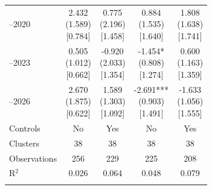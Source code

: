 \begin{threeparttable}
\begin{tabular}{@{}lcccc}
\addlinespace[0.25ex]
\addlinespace[0.25ex]
2018–2020 & \makecell{2.432 \\ (1.589) \\{}[0.784]} & \makecell{0.775 \\ (2.196) \\{}[1.458]} & \makecell{0.884 \\ (1.535) \\{}[1.640]} & \makecell{1.808 \\ (1.638) \\{}[1.741]} \\
\addlinespace[0.25ex]
\addlinespace[0.25ex]
2021–2023 & \makecell{0.505 \\ (1.012) \\{}[0.662]} & \makecell{-0.920 \\ (2.033) \\{}[1.354]} & \makecell{-1.454* \\ (0.808) \\{}[1.274]} & \makecell{0.600 \\ (1.163) \\{}[1.359]} \\
\addlinespace[0.25ex]
\addlinespace[0.25ex]
2024–2026 & \makecell{2.670 \\ (1.875) \\{}[0.622]} & \makecell{1.589 \\ (1.303) \\{}[1.092]} & \makecell{-2.691*** \\ (0.903) \\{}[1.491]} & \makecell{-1.633 \\ (1.056) \\{}[1.555]} \\
\addlinespace[0.25ex]
\midrule
\addlinespace[1ex]
Controls & No & Yes & No & Yes \\
\addlinespace[0.25ex]
\addlinespace[0.25ex]
Clusters & 38 & 38 & 38 & 38 \\
\addlinespace[0.25ex]
\addlinespace[0.25ex]
Observations & 256 & 229 & 225 & 208 \\
\addlinespace[0.25ex]
\addlinespace[0.25ex]
R$^2$ & 0.026 & 0.064 & 0.048 & 0.079 \\
\addlinespace[0.25ex]
\bottomrule
\end{tabular}
\endgroup
\noindent\begin{minipage}{\linewidth}\smallskip\footnotesize

\end{minipage}
\end{threeparttable}
